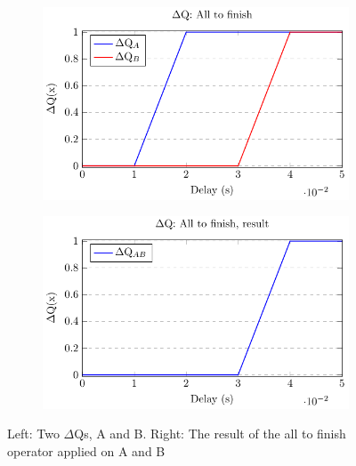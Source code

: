         \begin{figure}[H]
            \centering
            \begin{subfigure}{.5\textwidth}
                \centering
                \includegraphics[scale = 0.7]{tikz/atf_1.pdf}
                \label{fig:atf_1}
            \end{subfigure}%
            \begin{subfigure}{.5\textwidth}
                \centering
                \includegraphics[scale = 0.7]{tikz/atf_2.pdf}
                \label{fig:atf2}
            \end{subfigure}
            \caption{Left: Two $\Delta$Qs, A and B. Right: The result of the all to finish operator applied on A and B}%
            \label{fig:atf}
            \end{figure}

